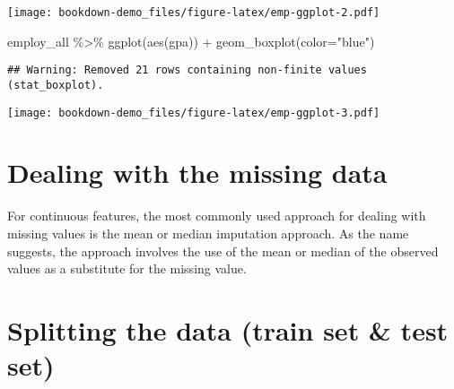 \documentclass[
]{book}
\newenvironment{Shaded}{\begin{snugshade}}{\end{snugshade}}
\newcommand{\AttributeTok}[1]{\textcolor[rgb]{0.77,0.63,0.00}{#1}}
\newcommand{\ConstantTok}[1]{\textcolor[rgb]{0.00,0.00,0.00}{#1}}
\newcommand{\FunctionTok}[1]{\textcolor[rgb]{0.00,0.00,0.00}{#1}}
\newcommand{\NormalTok}[1]{#1}
\newcommand{\OtherTok}[1]{\textcolor[rgb]{0.56,0.35,0.01}{#1}}
\newcommand{\SpecialCharTok}[1]{\textcolor[rgb]{0.00,0.00,0.00}{#1}}
\newcommand{\StringTok}[1]{\textcolor[rgb]{0.31,0.60,0.02}{#1}}
\begin{document}
\texttt{[image: bookdown-demo\_files/figure-latex/emp-ggplot-2.pdf]}

\begin{Shaded}
\begin{Highlighting}[]
\NormalTok{employ\_all }\SpecialCharTok{\%\textgreater{}\%}
  \FunctionTok{ggplot}\NormalTok{(}\FunctionTok{aes}\NormalTok{(gpa)) }\SpecialCharTok{+}
  \FunctionTok{geom\_boxplot}\NormalTok{(}\AttributeTok{color=}\StringTok{"blue"}\NormalTok{)}
\end{Highlighting}
\end{Shaded}

\begin{verbatim}
## Warning: Removed 21 rows containing non-finite values (stat_boxplot).
\end{verbatim}

\texttt{[image: bookdown-demo\_files/figure-latex/emp-ggplot-3.pdf]}

\hypertarget{dealing-with-the-missing-data}{%
\section{Dealing with the missing data}\label{dealing-with-the-missing-data}}

For continuous features, the most commonly used approach for dealing with missing
values is the mean or median imputation approach. As the name suggests, the approach involves the use of the mean or median of the observed values as a substitute for the missing value.

\begin{Shaded}
\end{Shaded}

\hypertarget{splitting-the-data-train-set-test-set}{%
\section{Splitting the data (train set \& test set)}\label{splitting-the-data-train-set-test-set}}
\end{document}

